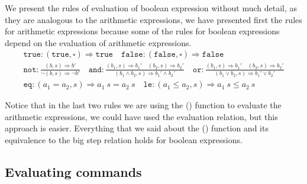 \documentclass[
  a4paper, 
  10pt, 
  parskip=half, 
  DIV=20,
  toc=bibliography,
  usegeometry,
]{scrartcl}
\newcommand{\funfont}[1]{\text{#1}}
\newcommand{\bigstep}{\Longrightarrow}
\begin{document}
We present the rules of evaluation of boolean expression without much detail,
as they are analogous to the arithmetic expressions, we have presented first
the rules for arithmetic expressions because some of the rules for boolean
expressions depend on the evaluation of arithmetic expressions.
\[
\begin{gathered}
  \texttt{true}: (\texttt{true}, \square) \bigstep \texttt{true} \quad
  \texttt{false}: (\texttt{false}, \square) \bigstep \texttt{false} \\
  \texttt{not}: \frac{(b, s) \bigstep b'}{\lnot (b, s) \bigstep \lnot b'} \quad
  \texttt{and}: \frac{(b_1, s) \bigstep b_1' \quad (b_2, s) \bigstep b_2'}
    {(b_1 \land b_2, s) \bigstep b_1' \land b_2'} \quad
  \texttt{or}: \frac{(b_1, s) \bigstep b_1' \quad (b_2, s) \bigstep b_2'}
    {(b_1 \lor b_2, s) \bigstep b_1' \lor b_2'} \\
  \texttt{eq}: (a_1 = a_2, s) \bigstep a_1 \ s = a_2 \ s \quad
  \texttt{le}: (a_1 \leq a_2, s) \bigstep a_1 \ s \leq a_2 \ s
\end{gathered}
\]

Notice that in the last two rules we are using the (\funfont{eval}) function to evaluate
the arithmetic expressions, we could have used the evaluation relation, but
this approach is easier. Everything that we said about the (\funfont{eval}) function
and its equivalence to the big step relation holds for boolean expressions.

\subsection{Evaluating commands}
\end{document}
